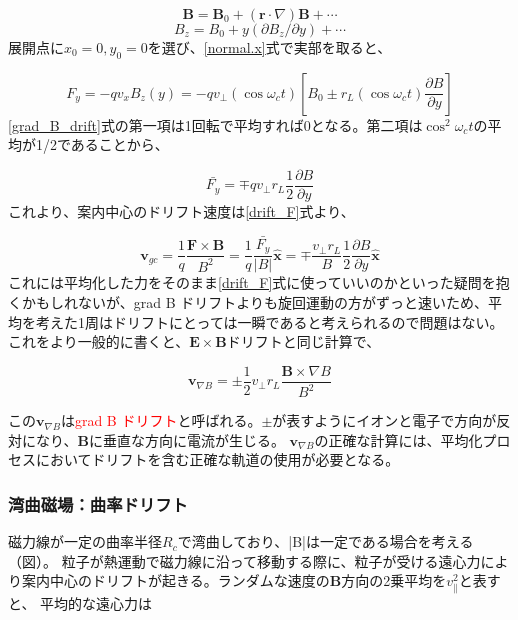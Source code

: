 \documentclass{ltjsarticle}
\numberwithin{equation}{section} %
\begin{document}
\begin{equation}
  \bm{B} = \bm{B}_0 + (\bm{r}\cdot \nabla)\bm{B} + \cdots
\end{equation}
\[
  B_z = B_0 + y(\partial B_z/\partial y) + \cdots
\]
展開点に$x_0=0, y_0=0$を選び、\eqref{normal.x}式で実部を取ると、

\begin{equation}
  F_y = -qv_x B_z(y) = -qv_\perp (\cos{\omega_ct})\left[B_0 \pm r_L(\cos{\omega_c t})\frac{\partial B}{\partial y}\right] \label{grad_B_drift}
\end{equation}
\eqref{grad_B_drift}式の第一項は1回転で平均すれば0となる。第二項は$\cos^2{\omega_c t}$の平均が1/2であることから、

\begin{equation}
  \bar{F_y} = \mp q v_\perp r_L \frac{1}{2}\frac{\partial B}{\partial y}
\end{equation}
これより、案内中心のドリフト速度は\eqref{drift_F}式より、

\begin{equation}
  \bm{v}_{gc} = \frac{1}{q}\frac{\bm{F} \times \bm{B}}{B^2} = \frac{1}{q} \frac{\bar{F_y}}{|B|}\hat{\bm{x}} = \mp \frac{v_\perp r_L}{B} \frac{1}{2} \frac{\partial B}{\partial y}\hat{\bm{x}}
\end{equation}
これには平均化した力をそのまま\eqref{drift_F}式に使っていいのかといった疑問を抱くかもしれないが、grad B ドリフトよりも旋回運動の方がずっと速いため、平均を考えた1周はドリフトにとっては一瞬であると考えられるので問題はない。
これをより一般的に書くと、$\bm{E}\times \bm{B}$ドリフトと同じ計算で、

\begin{equation}
  \boxed{\bm{v}_{\nabla B} = \pm \frac{1}{2}v_\perp r_L \frac{\bm{B}\times \nabla B}{B^2}} \label{df.grad_B_drift}
\end{equation}

この$\bm{v}_{\nabla B}$は\textcolor{red}{grad B ドリフト}と呼ばれる。$\pm$が表すようにイオンと電子で方向が反対になり、$\bm{B}$に垂直な方向に電流が生じる。
$\bm{v}_{\nabla B}$の正確な計算には、平均化プロセスにおいてドリフトを含む正確な軌道の使用が必要となる。

\subsubsection{湾曲磁場：曲率ドリフト}
磁力線が一定の曲率半径$R_c$で湾曲しており、|B|は一定である場合を考える（図）。
粒子が熱運動で磁力線に沿って移動する際に、粒子が受ける遠心力により案内中心のドリフトが起きる。ランダムな速度の$\bm{B}$方向の2乗平均を$v_\parallel ^2$と表すと、
平均的な遠心力は
\end{document}
